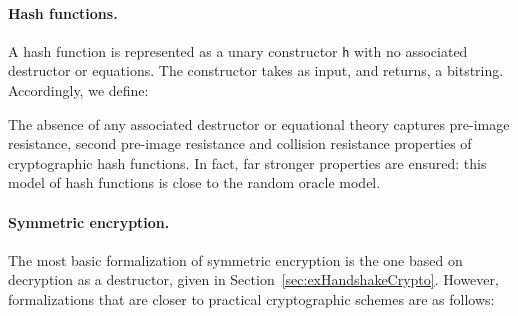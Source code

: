 \documentclass{book}
\begin{document}
\paragraph{Hash functions.} A hash function is represented as a unary constructor \lstinline{h} with no associated destructor or equations. The constructor takes as input, and returns, a bitstring. Accordingly, we define:
%

%
The absence of any associated destructor or equational theory captures pre-image resistance, second pre-image resistance and collision resistance properties of cryptographic hash functions. In fact, far stronger properties are ensured: this model of hash functions is close to the random oracle model.

\paragraph{Symmetric encryption.} The most basic formalization of symmetric encryption is the one based on decryption as a destructor, given in Section~\ref{sec:exHandshakeCrypto}. However, formalizations that are closer to practical cryptographic schemes are as follows:
\end{document}
